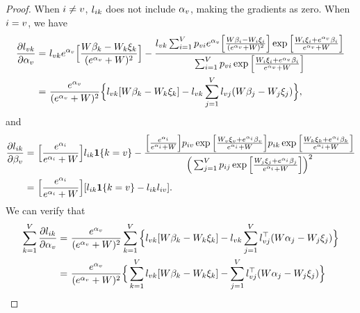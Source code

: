 \begin{proof}
When $i\neq v$, $l_{ik}$ does not include $\alpha_v$, making the gradients as zero. When $i=v$, we have
\begin{align*}
\frac{\partial l_{vk}}{\partial \alpha_v} = &~ l_{vk} e^{\alpha_v} \Big[\frac{W\beta_k-W_k\xi_k}{(e^{\alpha_v}+W)^2}\Big] - \frac{l_{vk}\sum_{i=1}^V p_{vi} e^{\alpha_v} \Big[\frac{W\beta_i-W_i\xi_i}{(e^{\alpha_v}+W)^2}\Big]\exp\Big[\frac{W_i\xi_i+e^{\alpha_v}\beta_i}{e^{\alpha_v}+W}\Big]}{\sum_{i=1}^V p_{vi}\exp\Big[\frac{W_i\xi_i+e^{\alpha_v}\beta_i}{e^{\alpha_v}+W}\Big]}\\
= &~ \frac{e^{\alpha_v}}{(e^{\alpha_v}+W)^2} \Big\{ l_{vk} [W\beta_k-W_k \xi_k] - l_{vk}\sum_{j=1}^V l_{vj} (W\beta_j - W_j\xi_j)\Big\},
\end{align*}
and
\begin{align*}
\frac{\partial l_{ik}}{\partial \beta_v} = &~ \Big[\frac{e^{\alpha_i}}{e^{\alpha_i}+W}\Big]l_{ik} \bm{1}\{k=v\} - \frac{\Big[\frac{e^{\alpha_i}}{e^{\alpha_i}+W}\Big]p_{iv}\exp\Big[\frac{W_v\xi_v+e^{\alpha_i}\beta_v}{e^{\alpha_i}+W}\Big]p_{ik}\exp\Big[\frac{W_k\xi_k+e^{\alpha_i}\beta_k}{e^{\alpha_i}+W}\Big]}{\Big(\sum_{j=1}^V p_{ij}\exp\Big[\frac{W_j\xi_j+e^{\alpha_i}\beta_j}{e^{\alpha_i}+W}\Big]\Big)^2}\\
= &~ \Big[\frac{e^{\alpha_i}}{e^{\alpha_i}+W}\Big] [ l_{ik} \bm{1}\{k=v\} - l_{ik} l_{iv} ].
\end{align*}
We can verify that 
\begin{align*}
\sum_{\tokk=1}^\vocabsize \frac{\partial \ppred_{\toki\tokk}}{\partial \sink_\tok} = &~  \frac{e^{\sink_\tok}}{(e^{\sink_\tok}+W)^2} \sum_{\tokk=1}^\vocabsize \Big\{ \ppred_{\tok\tokk} [W\ivalue_\tokk-W_\tokk \xi_\tokk] - \ppred_{\tok\tokk}\sum_{\tokj=1}^\vocabsize \ppred_{\tok\tokj}^\top (W\sink_\tokj - W_\tokj\xi_\tokj)\Big\}\\
= &~ \frac{e^{\sink_\tok}}{(e^{\sink_\tok}+W)^2}  \Big\{\sum_{\tokk=1}^\vocabsize \ppred_{\tok\tokk} [W\ivalue_\tokk-W_\tokk \xi_\tokk] - \sum_{\tokj=1}^\vocabsize \ppred_{\tok\tokj}^\top (W\sink_\tokj - W_\tokj\xi_\tokj)\Big\}\\

\end{align*}
\end{proof}
